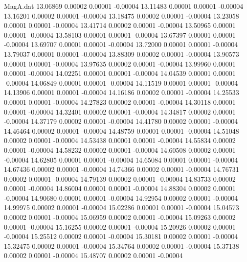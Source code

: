 \begin{filecontents}{MagA.dat}
  13.06869    0.00002    0.00001   -0.00004
  13.11483    0.00001    0.00001   -0.00004
  13.16201    0.00002    0.00001   -0.00004
  13.18475    0.00002    0.00001   -0.00004
  13.23058    0.00001    0.00001   -0.00004
  13.41714    0.00002    0.00001   -0.00004
  13.50965    0.00001    0.00001   -0.00004
  13.58103    0.00001    0.00001   -0.00004
  13.67397    0.00001    0.00001   -0.00004
  13.69707    0.00001    0.00001   -0.00004
  13.72000    0.00001    0.00001   -0.00004
  13.79037    0.00001    0.00001   -0.00004
  13.88309    0.00002    0.00001   -0.00004
  13.90573    0.00001    0.00001   -0.00004
  13.97635    0.00002    0.00001   -0.00004
  13.99960    0.00001    0.00001   -0.00004
  14.02251    0.00001    0.00001   -0.00004
  14.04539    0.00001    0.00001   -0.00004
  14.06849    0.00001    0.00001   -0.00004
  14.11519    0.00001    0.00001   -0.00004
  14.13906    0.00001    0.00001   -0.00004
  14.16186    0.00002    0.00001   -0.00004
  14.25533    0.00001    0.00001   -0.00004
  14.27823    0.00002    0.00001   -0.00004
  14.30118    0.00001    0.00001   -0.00004
  14.32401    0.00002    0.00001   -0.00004
  14.34817    0.00002    0.00001   -0.00004
  14.37179    0.00002    0.00001   -0.00004
  14.41780    0.00002    0.00001   -0.00004
  14.46464    0.00002    0.00001   -0.00004
  14.48759    0.00001    0.00001   -0.00004
  14.51048    0.00002    0.00001   -0.00004
  14.53438    0.00001    0.00001   -0.00004
  14.55834    0.00002    0.00001   -0.00004
  14.58232    0.00002    0.00001   -0.00004
  14.60508    0.00002    0.00001   -0.00004
  14.62805    0.00001    0.00001   -0.00004
  14.65084    0.00001    0.00001   -0.00004
  14.67436    0.00002    0.00001   -0.00004
  14.74366    0.00002    0.00001   -0.00004
  14.76731    0.00002    0.00001   -0.00004
  14.79139    0.00002    0.00001   -0.00004
  14.83733    0.00002    0.00001   -0.00004
  14.86004    0.00001    0.00001   -0.00004
  14.88304    0.00002    0.00001   -0.00004
  14.90680    0.00001    0.00001   -0.00004
  14.92954    0.00002    0.00001   -0.00004
  14.99975    0.00002    0.00001   -0.00004
  15.02286    0.00001    0.00001   -0.00004
  15.04573    0.00002    0.00001   -0.00004
  15.06959    0.00002    0.00001   -0.00004
  15.09263    0.00002    0.00001   -0.00004
  15.16255    0.00002    0.00001   -0.00004
  15.20926    0.00002    0.00001   -0.00004
  15.25512    0.00002    0.00001   -0.00004
  15.30181    0.00002    0.00001   -0.00004
  15.32475    0.00002    0.00001   -0.00004
  15.34764    0.00002    0.00001   -0.00004
  15.37138    0.00002    0.00001   -0.00004
  15.48707    0.00002    0.00001   -0.00004

\end{filecontents}
